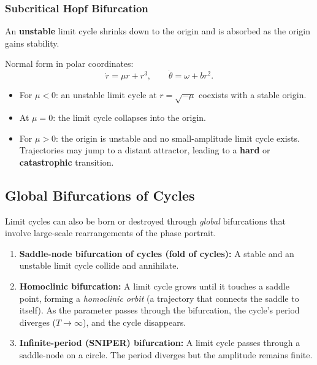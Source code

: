 \documentclass[11pt,letterpaper]{article}
\theoremstyle{definition}
\theoremstyle{plain}
\theoremstyle{remark}
\begin{document}
\subsubsection{Subcritical Hopf Bifurcation}

An \textbf{unstable} limit cycle shrinks down to the origin and is absorbed
as the origin gains stability.

Normal form in polar coordinates:
\begin{equation}
  \dot{r} = \mu r + r^3, \qquad \dot{\theta} = \omega + b r^2.
\end{equation}
\begin{itemize}[leftmargin=2em]
\item For $\mu < 0$: an unstable limit cycle at $r=\sqrt{-\mu}$ coexists
      with a stable origin.
\item At $\mu = 0$: the limit cycle collapses into the origin.
\item For $\mu > 0$: the origin is unstable and no small-amplitude limit
      cycle exists.  Trajectories may jump to a distant attractor, leading
      to a \textbf{hard} or \textbf{catastrophic} transition.
\end{itemize}

\subsection{Global Bifurcations of Cycles}

Limit cycles can also be born or destroyed through \emph{global}
bifurcations that involve large-scale rearrangements of the phase portrait.

\begin{enumerate}[leftmargin=2em]
\item \textbf{Saddle-node bifurcation of cycles (fold of cycles):}
      A stable and an unstable limit cycle collide and annihilate.
\item \textbf{Homoclinic bifurcation:} A limit cycle grows until it
      touches a saddle point, forming a \emph{homoclinic orbit} (a
      trajectory that connects the saddle to itself).  As the parameter
      passes through the bifurcation, the cycle's period diverges
      ($T\to\infty$), and the cycle disappears.
\item \textbf{Infinite-period (SNIPER) bifurcation:} A limit cycle passes
      through a saddle-node on a circle.  The period diverges but the
      amplitude remains finite.
\end{enumerate}
\end{document}
